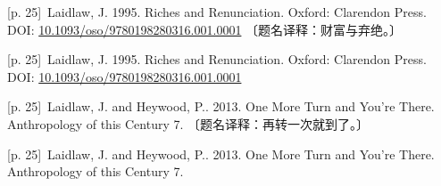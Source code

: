 \documentclass[10pt,a4paper]{article}
\begin{document}
\noindent\begin{minipage}{\textwidth}\begin{minipage}[t]{\dimexpr.5\textwidth-4mm\relax}\noindent\begin{minipage}[t]{\linewidth}{\scriptsize\color{gray} [p. 25]}\ Laidlaw, J. 1995. Riches and Renunciation. Oxford: Clarendon Press. DOI: \url{10.1093/oso/9780198280316.001.0001} 〔题名译释：财富与弃绝。〕\par\end{minipage}\par\end{minipage}\hfill\begin{minipage}[t]{\dimexpr.5\textwidth-4mm\relax}\noindent\begin{minipage}[t]{\linewidth}{\scriptsize\color{gray} [p. 25]}\ Laidlaw, J. 1995. Riches and Renunciation. Oxford: Clarendon Press. DOI: \url{10.1093/oso/9780198280316.001.0001}\par\end{minipage}\par\end{minipage}\end{minipage}\par
\noindent\begin{minipage}{\textwidth}\begin{minipage}[t]{\dimexpr.5\textwidth-4mm\relax}\noindent\begin{minipage}[t]{\linewidth}{\scriptsize\color{gray} [p. 25]}\ Laidlaw, J. and Heywood, P.. 2013. One More Turn and You’re There. Anthropology of this Century 7. 〔题名译释：再转一次就到了。〕\par\end{minipage}\par\end{minipage}\hfill\begin{minipage}[t]{\dimexpr.5\textwidth-4mm\relax}\noindent\begin{minipage}[t]{\linewidth}{\scriptsize\color{gray} [p. 25]}\ Laidlaw, J. and Heywood, P.. 2013. One More Turn and You’re There. Anthropology of this Century 7.\par\end{minipage}\par\end{minipage}\end{minipage}\par
\end{document}
